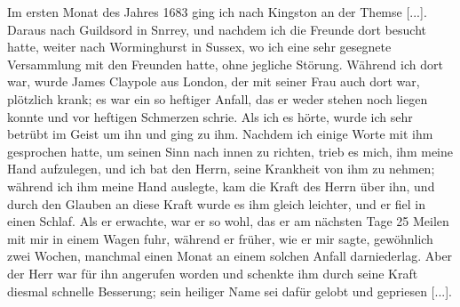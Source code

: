 Im ersten Monat des Jahres 1683 ging ich nach Kingston
an der Themse [...]. Daraus nach Guildsord in Snrrey, und
nachdem ich die Freunde dort besucht hatte, weiter nach 
Worminghurst in Sussex, wo ich 
eine sehr gesegnete Versammlung
mit den Freunden hatte, ohne jegliche Störung. Während ich
dort war, wurde James Claypole aus London, der mit seiner
Frau auch dort war, plötzlich krank; es war ein so heftiger Anfall,
das er weder stehen noch liegen konnte und vor heftigen Schmerzen
schrie. Als ich es hörte, wurde ich sehr betrübt im Geist um ihn
und ging zu ihm. Nachdem ich einige Worte mit ihm gesprochen
hatte, um seinen Sinn nach innen zu richten, trieb es mich, ihm
meine Hand aufzulegen, und ich bat den Herrn, seine Krankheit
von ihm zu nehmen; während ich ihm meine Hand auslegte, kam
die Kraft des Herrn über ihn, und durch den Glauben an diese
Kraft wurde es ihm gleich leichter, und er fiel in einen Schlaf.
Als er erwachte, war er so wohl, das er am nächsten Tage
25 Meilen mit mir in einem Wagen fuhr, während er früher,
wie er mir sagte, gewöhnlich zwei Wochen, manchmal einen
Monat an einem solchen Anfall darniederlag. Aber der Herr
war für ihn angerufen worden und schenkte ihm durch seine Kraft
diesmal schnelle Besserung; sein heiliger Name sei dafür gelobt
und gepriesen [...].
